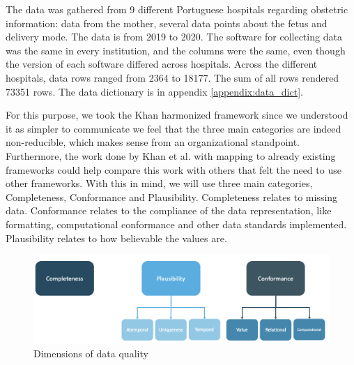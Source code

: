 The data was gathered from 9 different Portuguese hospitals regarding obstetric information: data from the mother, several data points about the fetus and delivery mode. The data is from 2019 to 2020. The software for collecting data was the same in every institution, and the columns were the same, even though the version of each software differed across hospitals. Across the different hospitals, data rows ranged from 2364 to 18177. The sum of all rows rendered 73351 rows. The data dictionary is in appendix \ref{appendix:data_dict}.

For this purpose, we took the Khan harmonized framework since we understood it as simpler to communicate we feel that the three main categories are indeed non-reducible, which makes sense from an organizational standpoint. Furthermore, the work done by Khan et al. with mapping to already existing frameworks could help compare this work with others that felt the need to use other frameworks.
With this in mind, we will use three main categories, Completeness, Conformance and Plausibility. Completeness relates to missing data. Conformance relates to the compliance of the data representation, like formatting, computational conformance and other data standards implemented. Plausibility relates to how believable the values are.

\begin{figure}[htbp]
\centering
\caption{Dimensions of data quality}\label{fig:categories} 
\includegraphics[scale=0.29]{imgs/data-quality-v1.png}
\end{figure}
